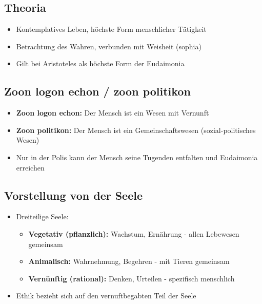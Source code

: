 \subsection{Theoria}
\begin{itemize}
    \item Kontemplatives Leben, höchste Form menschlicher Tätigkeit
    \item Betrachtung des Wahren, verbunden mit Weisheit (sophia)
    \item Gilt bei Aristoteles als höchste Form der Eudaimonia
\end{itemize}

\subsection{Zoon logon echon / zoon politikon}
\begin{itemize}
    \item \textbf{Zoon logon echon:} Der Mensch ist ein Wesen mit Vernunft
    \item \textbf{Zoon politikon:} Der Mensch ist ein Gemeinschaftswesen (sozial-politisches Wesen)
    \item Nur in der Polis kann der Mensch seine Tugenden entfalten und Eudaimonia erreichen
\end{itemize}

\subsection{Vorstellung von der Seele}
\begin{itemize}
    \item Dreiteilige Seele:
    \begin{itemize}
        \item \textbf{Vegetativ (pflanzlich):} Wachstum, Ernährung - allen Lebewesen gemeinsam
        \item \textbf{Animalisch:} Wahrnehmung, Begehren - mit Tieren gemeinsam
        \item \textbf{Vernünftig (rational):} Denken, Urteilen - spezifisch menschlich 
    \end{itemize}
    \item Ethik bezieht sich auf den vernuftbegabten Teil der Seele
\end{itemize}


